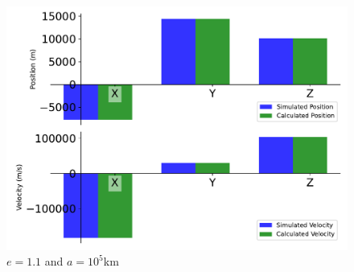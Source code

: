 \begin{figure}[htbp]\centerline{\includegraphics[height=0.7\textwidth, keepaspectratio]{AutoTeX/IncHyp_e_1}}\caption{$e = 1.1$ and $a = 10^5$km}\label{fig:IncHyp_e_1}\end{figure}